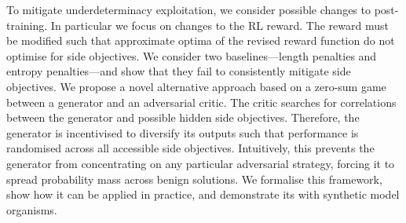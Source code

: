 


To mitigate underdeterminacy exploitation, we consider possible changes to post-training. In particular we focus on changes to the RL reward. The reward must be modified such that approximate optima of the revised reward function do not optimise for side objectives. We consider two baselines---length penalties and entropy penalties---and show that they fail to consistently mitigate side objectives. 
We propose a novel alternative approach based on a zero-sum game between a generator and an adversarial critic. The critic searches for correlations between the generator and possible hidden side objectives. Therefore, the generator is incentivised to diversify its outputs such that performance is randomised across all accessible side objectives. Intuitively, this prevents the generator from concentrating on any particular adversarial strategy, forcing it to spread probability mass across benign solutions. We formalise this framework, show how it can be applied in practice, and demonstrate its with synthetic model organisms.

